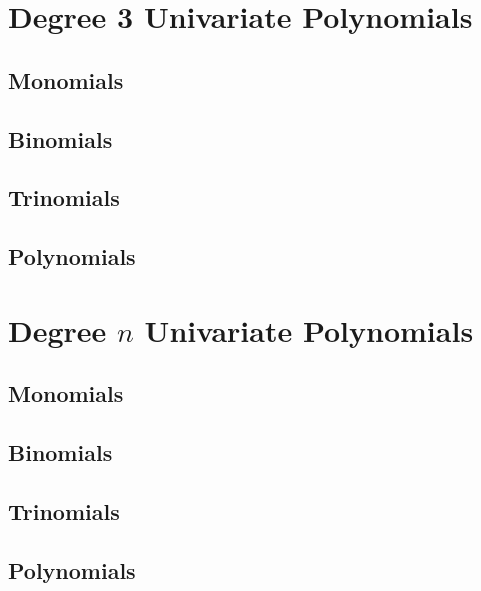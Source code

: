 \section{Degree 3 Univariate Polynomials}

\subsection*{Monomials}

\subsection*{Binomials}

\subsection*{Trinomials}

\subsection*{Polynomials}

\section{Degree $n$ Univariate Polynomials}

\subsection*{Monomials}



\subsection*{Binomials}

\subsection*{Trinomials}

\subsection*{Polynomials}